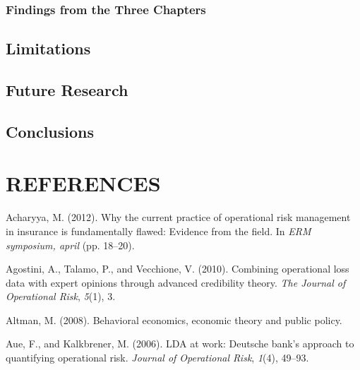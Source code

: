 \documentclass[]{DissertateUSU}
\begin{document}
\subsection{Findings from the Three
Chapters}\label{findings-from-the-three-chapters}

\section{Limitations}\label{limitations}

\section{Future Research}\label{future-research}

\section{Conclusions}\label{conclusions-1}

\singlespacing

\FloatBarrier

\newpage

 \fancyhead[R]{\thepage} \fancyfoot[C]{}

\chapter*{REFERENCES}

\setlength{\parindent}{-0.5in} \setlength{\leftskip}{0.4in}
\setlength{\parskip}{6pt} \noindent

\hypertarget{refs}{}
\hypertarget{ref-acharyya2012current}{}
Acharyya, M. (2012). Why the current practice of operational risk
management in insurance is fundamentally flawed: Evidence from the
field. In \emph{ERM symposium, april} (pp. 18--20).

\hypertarget{ref-agostini2010combining}{}
Agostini, A., Talamo, P., and Vecchione, V. (2010). Combining
operational loss data with expert opinions through advanced credibility
theory. \emph{The Journal of Operational Risk}, \emph{5}(1), 3.

\hypertarget{ref-altman2008behavioral}{}
Altman, M. (2008). Behavioral economics, economic theory and public
policy.

\hypertarget{ref-aue2006lda}{}
Aue, F., and Kalkbrener, M. (2006). LDA at work: Deutsche bank's
approach to quantifying operational risk. \emph{Journal of Operational
Risk}, \emph{1}(4), 49--93.
\end{document}
